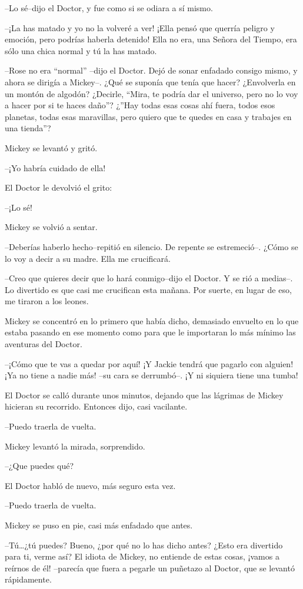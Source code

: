 --Lo sé--dijo el Doctor, y fue como si se odiara a sí mismo.

--¡La has matado y yo no la volveré a ver! ¡Ella pensó que querría
peligro y emoción, pero podrías haberla detenido! Ella no era, una
Señora del Tiempo, era sólo una chica normal y tú la has matado.

--Rose no era ``normal'' --dijo el Doctor. Dejó de sonar enfadado
consigo mismo, y ahora se dirigía a Mickey--. ¿Qué se suponía que tenía
que hacer? ¿Envolverla en un montón de algodón? ¿Decirle, ``Mira, te
podría dar el universo, pero no lo voy a hacer por si te haces daño''?
¿''Hay todas esas cosas ahí fuera, todos esos planetas, todas esas
maravillas, pero quiero que te quedes en casa y trabajes en una
tienda''?

Mickey se levantó y gritó.

--¡Yo habría cuidado de ella!

El Doctor le devolvió el grito:

--¡Lo sé!

Mickey se volvió a sentar.

--Deberías haberlo hecho--repitió en silencio. De repente se
estremeció--. ¿Cómo se lo voy a decir a su madre. Ella me crucificará.

--Creo que quieres decir que lo hará conmigo--dijo el Doctor. Y se rió a
medias--. Lo divertido es que casi me crucifican esta mañana. Por
suerte, en lugar de eso, me tiraron a los leones.

Mickey se concentró en lo primero que había dicho, demasiado envuelto en
lo que estaba pasando en ese momento como para que le importaran lo más
mínimo las aventuras del Doctor.

--¡Cómo que te vas a quedar por aquí! ¡Y Jackie tendrá que pagarlo con
alguien! ¡Ya no tiene a nadie más! --su cara se derrumbó--. ¡Y ni
siquiera tiene una tumba!

El Doctor se calló durante unos minutos, dejando que las lágrimas de
Mickey hicieran su recorrido. Entonces dijo, casi vacilante.

--Puedo traerla de vuelta.

Mickey levantó la mirada, sorprendido.

--¿Que puedes qué?

El Doctor habló de nuevo, más seguro esta vez.

--Puedo traerla de vuelta.

Mickey se puso en pie, casi más enfadado que antes.

--Tú\ldots{}¿tú puedes? Bueno, ¿por qué no lo has dicho antes? ¿Esto era
divertido para ti, verme así? El idiota de Mickey, no entiende de estas
cosas, ¡vamos a reírnos de él! --parecía que fuera a pegarle un puñetazo
al Doctor, que se levantó rápidamente.

